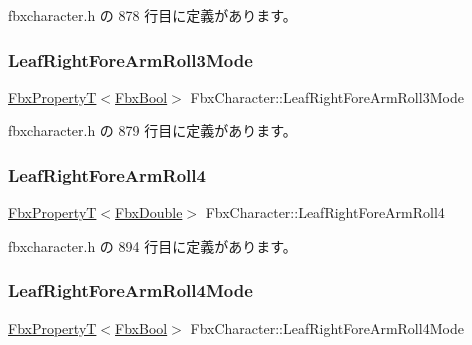  fbxcharacter.\+h の 878 行目に定義があります。

\mbox{\label{class_fbx_character_a554b248d818f38ed7bc22fef96362a65}} 
\subsubsection{\texorpdfstring{Leaf\+Right\+Fore\+Arm\+Roll3\+Mode}{LeafRightForeArmRoll3Mode}}
{\footnotesize\ttfamily \hyperlink{class_fbx_property_t}{Fbx\+PropertyT}$<$\hyperlink{fbxtypes_8h_a92e0562b2fe33e76a242f498b362262e}{Fbx\+Bool}$>$ Fbx\+Character\+::\+Leaf\+Right\+Fore\+Arm\+Roll3\+Mode}



 fbxcharacter.\+h の 879 行目に定義があります。

\mbox{\label{class_fbx_character_a137288a59c2effdd4dc58be5d2dc27b8}} 
\subsubsection{\texorpdfstring{Leaf\+Right\+Fore\+Arm\+Roll4}{LeafRightForeArmRoll4}}
{\footnotesize\ttfamily \hyperlink{class_fbx_property_t}{Fbx\+PropertyT}$<$\hyperlink{fbxtypes_8h_a171e72a1c46fc15c1a6c9c31948c1c5b}{Fbx\+Double}$>$ Fbx\+Character\+::\+Leaf\+Right\+Fore\+Arm\+Roll4}



 fbxcharacter.\+h の 894 行目に定義があります。

\mbox{\label{class_fbx_character_a47514db9e67e2b8cf737977951edd431}} 
\subsubsection{\texorpdfstring{Leaf\+Right\+Fore\+Arm\+Roll4\+Mode}{LeafRightForeArmRoll4Mode}}
{\footnotesize\ttfamily \hyperlink{class_fbx_property_t}{Fbx\+PropertyT}$<$\hyperlink{fbxtypes_8h_a92e0562b2fe33e76a242f498b362262e}{Fbx\+Bool}$>$ Fbx\+Character\+::\+Leaf\+Right\+Fore\+Arm\+Roll4\+Mode}



